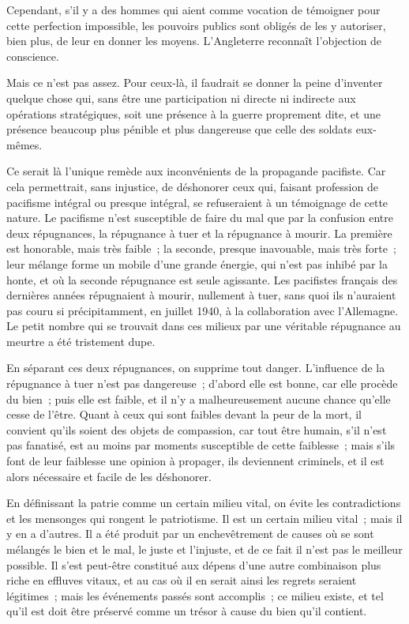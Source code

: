 \documentclass[french,twoside]{book} %
\begin{document}
Cependant, s'il y a des hommes qui aient comme vocation de témoigner pour cette perfection impossible, les pouvoirs publics sont obligés de les y autoriser, bien plus, de leur en donner les moyens. L'Angleterre reconnaît l'objection de conscience.\par
Mais ce n'est pas assez. Pour ceux-là, il faudrait se donner la peine d'inventer quelque chose qui, sans être une participation ni directe ni indirecte aux opérations stratégiques, soit une présence à la guerre proprement dite, et une présence beaucoup plus pénible et plus dangereuse que celle des soldats eux-mêmes.\par
Ce serait là l'unique remède aux inconvénients de la propagande pacifiste. Car cela permettrait, sans injustice, de déshonorer ceux qui, faisant profession de pacifisme intégral ou presque intégral, se refuseraient à un témoignage de cette nature. Le pacifisme n'est susceptible de faire du mal que par la confusion entre deux répugnances, la répugnance à tuer et la répugnance à mourir. La première est honorable, mais très faible ; la seconde, presque inavouable, mais très forte ; leur mélange forme un mobile d'une grande énergie, qui n'est pas inhibé par la honte, et où la seconde répugnance est seule agissante. Les pacifistes français des dernières années répugnaient à mourir, nullement à tuer, sans quoi ils n'auraient pas couru si précipitamment, en juillet 1940, à la collaboration avec l'Allemagne. Le petit nombre qui se trouvait dans ces milieux par une véritable répugnance au meurtre a été tristement dupe.\par
En séparant ces deux répugnances, on supprime tout danger. L'influence de la répugnance à tuer n'est pas dangereuse ; d'abord elle est bonne, car elle procède du bien ; puis elle est faible, et il n'y a malheureusement aucune chance qu'elle cesse de l'être. Quant à ceux qui sont faibles devant la peur de la mort, il convient qu'ils soient des objets de compassion, car tout être humain, s'il n'est pas fanatisé, est au moins par moments susceptible de cette faiblesse ; mais s'ils font de leur faiblesse une opinion à propager, ils deviennent criminels, et il est alors nécessaire et facile de les déshonorer.\par
En définissant la patrie comme un certain milieu vital, on évite les contradictions et les mensonges qui rongent le patriotisme. Il est un certain milieu vital ; mais il y en a d'autres. Il a été produit par un enchevêtrement de causes où se sont mélangés le bien et le mal, le juste et l'injuste, et de ce fait il n'est pas le meilleur possible. Il s'est peut-être constitué aux dépens d'une autre combinaison plus riche en effluves vitaux, et au cas où il en serait ainsi les regrets seraient légitimes ; mais les événements passés sont accomplis ; ce milieu existe, et tel qu'il est doit être préservé comme un trésor à cause du bien qu'il contient.\par
\end{document}
